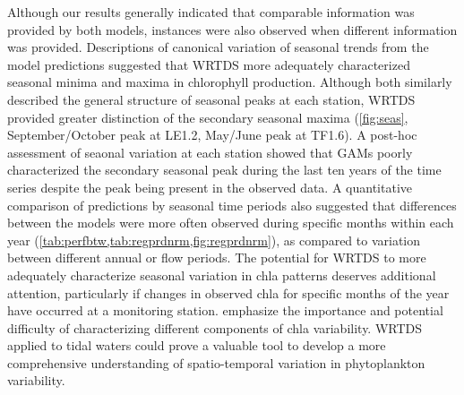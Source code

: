 \documentclass[letterpaper,12pt,oneside]{article}\usepackage[]{graphicx}\usepackage[]{color}
\begin{document}
Although our results generally indicated that comparable information was provided by both models, instances were also observed when different information was provided.  Descriptions of canonical variation of seasonal trends from the model predictions suggested that \ac{WRTDS} more adequately characterized seasonal minima and maxima in chlorophyll production.  Although both similarly described the general structure of seasonal peaks at each station, \ac{WRTDS} provided greater distinction of the secondary seasonal maxima (\cref{fig:seas}, September/October peak at LE1.2, May/June peak at TF1.6).  A post-hoc assessment of seaonal variation at each station showed that \acp{GAM} poorly characterized the secondary seasonal peak during the last ten years of the time series despite the peak being present in the observed data.  A quantitative comparison of predictions by seasonal time periods also suggested that differences between the models were more often observed during specific months within each year (\cref{tab:perfbtw,tab:regprdnrm,fig:regprdnrm}), as compared to variation between different annual or flow periods.  The potential for \ac{WRTDS} to more adequately characterize seasonal variation in \ac{chla} patterns deserves additional attention, particularly if changes in observed \ac{chla} for specific months of the year have occurred at a monitoring station.  \citet{Cloern10} emphasize the importance and potential difficulty of characterizing different components of \ac{chla} variability.  \ac{WRTDS} applied to tidal waters could prove a valuable tool to develop a more comprehensive understanding of spatio-temporal variation in phytoplankton variability.   
\end{document}
